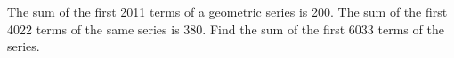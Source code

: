 The sum of the first 2011 terms of a geometric series is 200. The sum of the first 4022 terms of the same series is 380. Find the sum of the first 6033 terms of the series.